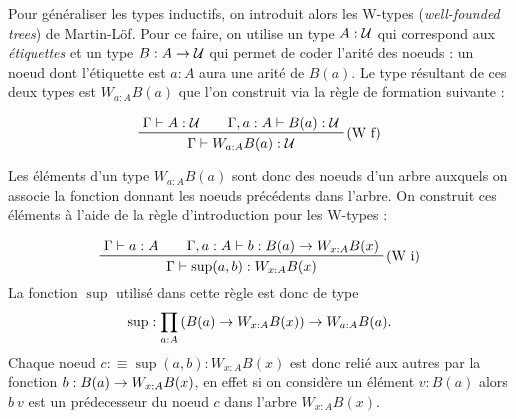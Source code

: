 \documentclass[../../rapport.tex]{subfiles}
\begin{document}
  \begin{figure}[ht]
    \centering
  \end{figure}

  Pour généraliser les types inductifs, on introduit alors les W-types (\textit{well-founded trees}) de Martin-Löf.
  Pour ce faire, on utilise un type $A : \mathcal U$ qui correspond aux \textit{étiquettes} et un type $B : A \rightarrow \mathcal U$ qui
  permet de coder l'arité des noeuds : un noeud dont l'étiquette est $a : A$ aura une arité de $B(a)$.
  Le type résultant de ces deux types est $W_{a:A} B(a)$ que l'on construit via la règle de formation suivante :

  $$
  \prfinterspace=2em
  \prftree[r]{(W f)}{\Gamma \vdash A : \U}{\Gamma, a : A \vdash B(a) : \U}{\Gamma \vdash W_{a: A} B(a) : \U}
  $$

  Les éléments d'un type $W_{a:A}B(a)$ sont donc des noeuds d'un arbre auxquels on associe la fonction donnant
  les noeuds précédents dans l'arbre. On construit ces éléments à l'aide
  de la règle d'introduction pour les W-types :

  $$
  \prfinterspace=2em
  \prftree[r]{(W i)}{\Gamma \vdash a : A}{\Gamma, a : A \vdash b : B(a) \fun W_{x:A}B(x)}
    {\Gamma \vdash \sup(a, b) : W_{x:A}B(x)}
  $$
  La fonction $\sup$ utilisé dans cette règle est donc de type
  $$\sup : \prod_{a:A}{\left(B(a) \rightarrow W_{x:A}B(x)\right)} \rightarrow W_{a:A}B(a).$$
  Chaque noeud $c :\equiv \sup(a, b) : W_{x:A}B(x)$ est donc relié aux autres par la fonction $b : B(a) \rightarrow W_{x:A}B(x)$,
  en effet si on considère un élément $v : B(a)$ alors $b\ v$ est un prédecesseur du noeud $c$ dans l'arbre $W_{x:A}B(x)$.

  \begin{figure}[ht]
    \centering
  \end{figure}
\end{document}
